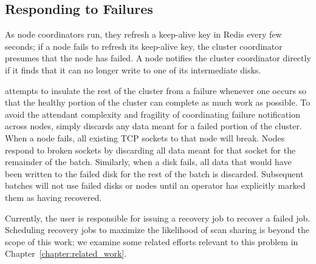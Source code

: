\subsection{Responding to Failures}
\label{sec:fault_response}

As node coordinators run, they refresh a keep-alive key in Redis every few
seconds; if a node fails to refresh its keep-alive key, the cluster coordinator
presumes that the node has failed. A node notifies the cluster coordinator
directly if it finds that it can no longer write to one of its intermediate
disks.

\themis attempts to insulate the rest of the cluster from a failure whenever
one occurs so that the healthy portion of the cluster can complete as much work
as possible. To avoid the attendant complexity and fragility of coordinating
failure notification across nodes, \themis simply discards any data meant for a
failed portion of the cluster. When a node fails, all existing TCP sockets to
that node will break. Nodes respond to broken sockets by discarding all data
meant for that socket for the remainder of the batch. Similarly, when a disk
fails, all data that would have been written to the failed disk for the rest of
the batch is discarded. Subsequent batches will not use failed disks or nodes
until an operator has explicitly marked them as having recovered.

Currently, the user is responsible for issuing a recovery job to recover a
failed job. Scheduling recovery jobs to maximize the likelihood of scan sharing
is beyond the scope of this work; we examine some related efforts relevant to
this problem in Chapter~\ref{chapter:related_work}.
